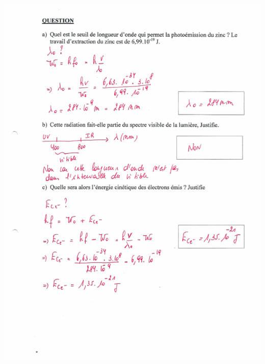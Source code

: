 {\includegraphics[width=17.498cm,height=24.13cm]{Pictures/10000001000002570000033BB37256DDDEE8E8E4.png}

}
